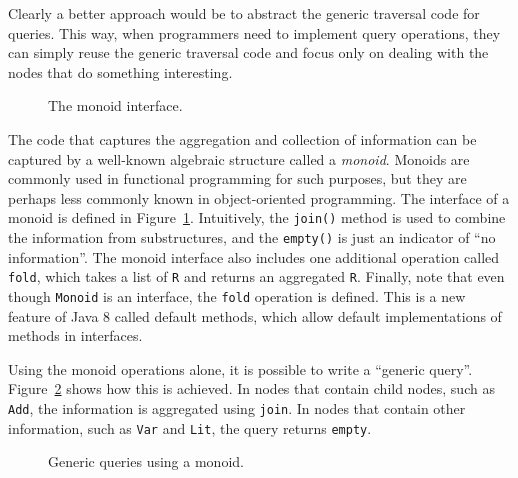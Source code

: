 Clearly a better approach would be to abstract the generic traversal 
code for queries. This way, when programmers need to implement query 
operations, they can simply reuse the generic traversal code and 
focus only on dealing with the nodes that do something interesting. 


\begin{figure}[tb]
\vspace{-.1in}
\caption{The monoid interface.}
\label{monoid}
\end{figure}

The code that captures the aggregation and collection of information
can be captured by a well-known algebraic structure called a
\emph{monoid}. Monoids are commonly used in functional programming
for such purposes, but they are perhaps less commonly known in
object-oriented programming.  The interface of a monoid is defined in
Figure~\ref{monoid}. Intuitively, the \lstinline{join()} method is
used to combine the information from substructures, and the
\lstinline{empty()} is just an indicator of ``no information''.
The monoid interface also includes one additional operation 
called \lstinline{fold}, which takes a list of \lstinline{R} 
and returns an aggregated \lstinline{R}. Finally, note that 
even though \lstinline{Monoid} is an interface, the 
\lstinline{fold} operation is defined. This is a new feature 
of Java 8 called default methods, which allow default implementations 
of methods in interfaces.

Using the monoid operations alone, it is possible to write a ``generic
query''. Figure~\ref{generic_query} shows how this is achieved. In
nodes that contain child nodes, such as \lstinline{Add}, the
information is aggregated using \lstinline{join}. In nodes that
contain other information, such as \lstinline{Var} and
\lstinline{Lit}, the query returns \lstinline{empty}. 

\begin{figure}[tb]
\vspace{-.1in}
\caption{Generic queries using a monoid.}
\label{generic_query}
\end{figure}

